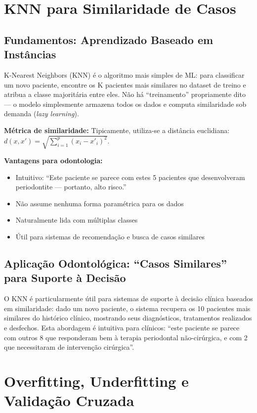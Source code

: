 \section{KNN para Similaridade de Casos}

\subsection{Fundamentos: Aprendizado Baseado em Instâncias}

K-Nearest Neighbors (KNN)  é o algoritmo mais simples de ML: para classificar um novo paciente, encontre os K pacientes mais similares no dataset de treino e atribua a classe majoritária entre eles. Não há ``treinamento'' propriamente dito — o modelo simplesmente armazena todos os dados e computa similaridade sob demanda (\textit{lazy learning}).

\textbf{Métrica de similaridade:} Tipicamente, utiliza-se a distância euclidiana: $d(x, x') = \sqrt{\sum_{i=1}^p (x_i - x'_i)^2}$.

\textbf{Vantagens para odontologia:}
\begin{itemize}
    \item Intuitivo: ``Este paciente se parece com estes 5 pacientes que desenvolveram periodontite — portanto, alto risco.''
    \item Não assume nenhuma forma paramétrica para os dados
    \item Naturalmente lida com múltiplas classes
    \item Útil para sistemas de recomendação e busca de casos similares
\end{itemize}

\subsection{Aplicação Odontológica: ``Casos Similares'' para Suporte à Decisão}

O KNN é particularmente útil para sistemas de suporte à decisão clínica baseados em similaridade: dado um novo paciente, o sistema recupera os 10 pacientes mais similares do histórico clínico, mostrando seus diagnósticos, tratamentos realizados e desfechos. Esta abordagem é intuitiva para clínicos: ``este paciente se parece com outros 8 que responderam bem à terapia periodontal não-cirúrgica, e com 2 que necessitaram de intervenção cirúrgica''.

\section{Overfitting, Underfitting e Validação Cruzada}

